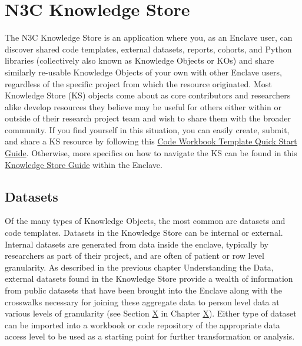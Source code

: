 \documentclass[
  letterpaper,
  DIV=11,
  numbers=noendperiod]{scrreprt}
\begin{document}
\hypertarget{n3c-knowledge-store}{%
\section{N3C Knowledge Store}\label{n3c-knowledge-store}}

The N3C Knowledge Store is an application where you, as an Enclave user,
can discover shared code templates, external datasets, reports, cohorts,
and Python libraries (collectively also known as Knowledge Objects or
KOs) and share similarly re-usable Knowledge Objects of your own with
other Enclave users, regardless of the specific project from which the
resource originated. Most Knowledge Store (KS) objects come about as
core contributors and researchers alike develop resources they believe
may be useful for others either within or outside of their research
project team and wish to share them with the broader community. If you
find yourself in this situation, you can easily create, submit, and
share a KS resource by following this
\href{https://unite.nih.gov/workspace/report/ri.report.main.report.1d9ad825-30d1-475c-b77b-88836af5ea2c}{Code
Workbook Template Quick Start Guide}. Otherwise, more specifics on how
to navigate the KS can be found in this
\href{https://unite.nih.gov/workspace/report/ri.report.main.report.7ac7904d-bbc3-4678-a224-8b8b7c12d40e}{Knowledge
Store Guide} within the Enclave.

\hypertarget{datasets}{%
\subsection{Datasets}\label{datasets}}

Of the many types of Knowledge Objects, the most common are datasets and
code templates. Datasets in the Knowledge Store can be internal or
external. Internal datasets are generated from data inside the enclave,
typically by researchers as part of their project, and are often of
patient or row level granularity. As described in the previous chapter
Understanding the Data, external datasets found in the Knowledge Store
provide a wealth of information from public datasets that have been
brought into the Enclave along with the crosswalks necessary for joining
these aggregate data to person level data at various levels of
granularity (see Section
\protect\hyperlink{Publicux2fExternal-Datasets}{X} in Chapter
\protect\hyperlink{Understanding-the-Data}{X}). Either type of dataset
can be imported into a workbook or code repository of the appropriate
data access level to be used as a starting point for further
transformation or analysis.
\end{document}
